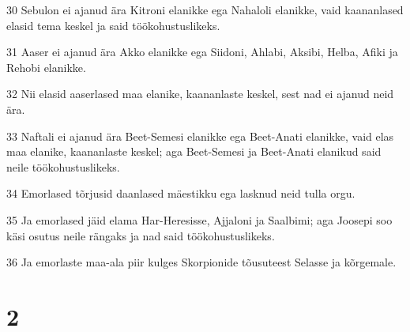 \par 30 Sebulon ei ajanud ära Kitroni elanikke ega Nahaloli elanikke, vaid kaananlased elasid tema keskel ja said töökohustuslikeks.
\par 31 Aaser ei ajanud ära Akko elanikke ega Siidoni, Ahlabi, Aksibi, Helba, Afiki ja Rehobi elanikke.
\par 32 Nii elasid aaserlased maa elanike, kaananlaste keskel, sest nad ei ajanud neid ära.
\par 33 Naftali ei ajanud ära Beet-Semesi elanikke ega Beet-Anati elanikke, vaid elas maa elanike, kaananlaste keskel; aga Beet-Semesi ja Beet-Anati elanikud said neile töökohustuslikeks.
\par 34 Emorlased tõrjusid daanlased mäestikku ega lasknud neid tulla orgu.
\par 35 Ja emorlased jäid elama Har-Heresisse, Ajjaloni ja Saalbimi; aga Joosepi soo käsi osutus neile rängaks ja nad said töökohustuslikeks.
\par 36 Ja emorlaste maa-ala piir kulges Skorpionide tõusuteest Selasse ja kõrgemale.

\chapter{2}

